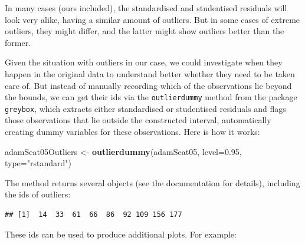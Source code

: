 \documentclass[]{book}
\newenvironment{Shaded}{\begin{snugshade}}{\end{snugshade}}
\newcommand{\DataTypeTok}[1]{\textcolor[rgb]{0.13,0.29,0.53}{#1}}
\newcommand{\FloatTok}[1]{\textcolor[rgb]{0.00,0.00,0.81}{#1}}
\newcommand{\KeywordTok}[1]{\textcolor[rgb]{0.13,0.29,0.53}{\textbf{#1}}}
\newcommand{\NormalTok}[1]{#1}
\newcommand{\OperatorTok}[1]{\textcolor[rgb]{0.81,0.36,0.00}{\textbf{#1}}}
\newcommand{\StringTok}[1]{\textcolor[rgb]{0.31,0.60,0.02}{#1}}
\theoremstyle{definition}
\theoremstyle{definition}
\theoremstyle{definition}
\theoremstyle{definition}
\theoremstyle{remark}
\begin{document}
In many cases (ours included), the standardised and studentised residuals will look very alike, having a similar amount of outliers. But in some cases of extreme outliers, they might differ, and the latter might show outliers better than the former.

Given the situation with outliers in our case, we could investigate when they happen in the original data to understand better whether they need to be taken care of. But instead of manually recording which of the observations lie beyond the bounds, we can get their ids via the \texttt{outlierdummy} method from the package \texttt{greybox}, which extracts either standardised or studentised residuals and flags those observations that lie outside the constructed interval, automatically creating dummy variables for these observations. Here is how it works:

\begin{Shaded}
\begin{Highlighting}[]
\NormalTok{adamSeat05Outliers <-}
\StringTok{  }\KeywordTok{outlierdummy}\NormalTok{(adamSeat05,}
               \DataTypeTok{level=}\FloatTok{0.95}\NormalTok{, }\DataTypeTok{type=}\StringTok{"rstandard"}\NormalTok{)}
\end{Highlighting}
\end{Shaded}

The method returns several objects (see the documentation for details), including the ids of outliers:

\begin{Shaded}
\end{Shaded}

\begin{verbatim}
## [1]  14  33  61  66  86  92 109 156 177
\end{verbatim}

These ids can be used to produce additional plots. For example:
\end{document}
